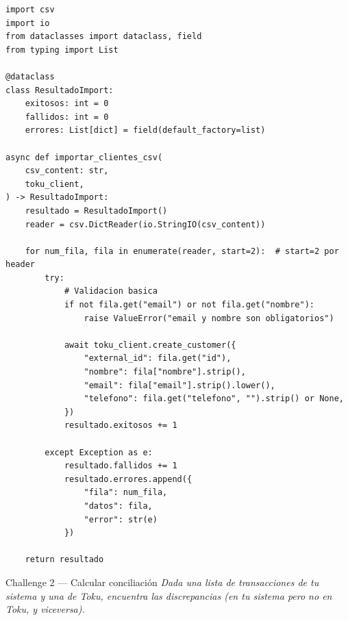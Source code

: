 \documentclass[11pt,a4paper]{article}
\begin{document}
\begin{respuestabox}
\begin{lstlisting}[style=python]
import csv
import io
from dataclasses import dataclass, field
from typing import List

@dataclass
class ResultadoImport:
    exitosos: int = 0
    fallidos: int = 0
    errores: List[dict] = field(default_factory=list)

async def importar_clientes_csv(
    csv_content: str,
    toku_client,
) -> ResultadoImport:
    resultado = ResultadoImport()
    reader = csv.DictReader(io.StringIO(csv_content))

    for num_fila, fila in enumerate(reader, start=2):  # start=2 por header
        try:
            # Validacion basica
            if not fila.get("email") or not fila.get("nombre"):
                raise ValueError("email y nombre son obligatorios")

            await toku_client.create_customer({
                "external_id": fila.get("id"),
                "nombre": fila["nombre"].strip(),
                "email": fila["email"].strip().lower(),
                "telefono": fila.get("telefono", "").strip() or None,
            })
            resultado.exitosos += 1

        except Exception as e:
            resultado.fallidos += 1
            resultado.errores.append({
                "fila": num_fila,
                "datos": fila,
                "error": str(e)
            })

    return resultado
\end{lstlisting}
\end{respuestabox}

\vspace{8pt}

\begin{preguntabox}{Challenge 2 — Calcular conciliación}
\textit{Dada una lista de transacciones de tu sistema y una de Toku,
encuentra las discrepancias (en tu sistema pero no en Toku, y viceversa).}
\end{preguntabox}
\end{document}
